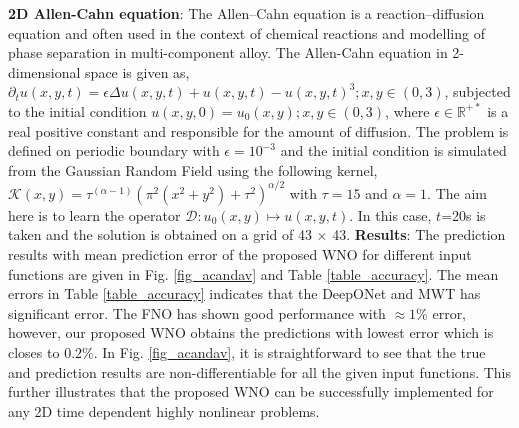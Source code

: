 \documentclass{article}
\begin{document}
\textbf{2D Allen-Cahn equation}: The Allen–Cahn equation is a reaction–diffusion equation and often used in the context of chemical reactions and modelling of phase separation in multi-component alloy. The Allen-Cahn equation in 2-dimensional space is given as,
$\partial_t u(x,y,t) = \epsilon \Delta u(x,y,t) + u(x,y,t) - u(x,y,t)^3; x,y \in (0,3)$, subjected to the initial condition $u(x,y,0) = u_0(x,y); x,y \in (0,3)$, where $\epsilon \in \mathbb{R}^{+*}$ is a real positive constant and responsible for the amount of diffusion. The problem is defined on periodic boundary with $\epsilon = 10^{-3}$ and the initial condition is simulated from the Gaussian Random Field using the following kernel, $\mathcal{K}(x,y)= \tau^{(\alpha-1)}\left(\pi^2(x^2+y^2) + \tau^2 \right)^{\alpha/2}$ with $\tau=15$ and $\alpha=1$. 
The aim here is to learn the operator $\mathcal{D}:u_{0}(x,y) \mapsto u(x,y,t)$. In this case, $t$=20s is taken and the solution is obtained on a grid of 43 $\times$ 43. 
\textbf{Results}: The prediction results with mean prediction error of the proposed WNO for different input functions are given in Fig. \ref{fig_acandav} and Table \ref{table_accuracy}. 
The mean errors in Table \ref{table_accuracy} indicates that the DeepONet and MWT has significant error. The FNO has shown good performance with $\approx 1 \%$ error, however, our proposed WNO obtains the predictions with lowest error which is closes to $0.2 \%$. In Fig. \ref{fig_acandav}, it is straightforward to see that the true and prediction results are non-differentiable for all the given input functions. This further illustrates that the proposed WNO can be successfully implemented for any 2D time dependent highly nonlinear problems. 
\end{document}
